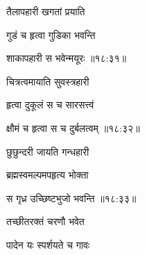 \nemslokab

{\devanagarifontbold तैलापहारी खगतां प्रयाति  \danda\dontdisplaylinenum }%
 
\nemslokac

{\devanagarifontbold गुडं च हृत्वा गुडिका भवन्ति }%
  \dontdisplaylinenum    {}


\nemslokad

{\devanagarifontbold शाकापहारी स भवेन्मयूरः {॥१८:३१॥} \veg\dontdisplaylinenum }%

\ujvers{}

\nemslokab

{\devanagarifontbold चित्रत्वमायाति सुवस्त्रहारी  \danda\dontdisplaylinenum }%
 
\nemslokac

{\devanagarifontbold हृत्वा दुकूलं स च सारसत्त्वं }%
  \dontdisplaylinenum

\nemslokad

{\devanagarifontbold क्षौमं च हृत्वा स च दुर्बलत्वम् {॥१८:३२॥} \veg\dontdisplaylinenum }%
 
\ujvers{}

\nemslokab

{\devanagarifontbold छुछुन्दरी जायति गन्धहारी  \danda\dontdisplaylinenum }%
 
\nemslokac

{\devanagarifontbold ब्रह्मस्वमल्पमपहृत्य भोक्ता }%
  \dontdisplaylinenum

\nemslokad

{\devanagarifontbold स गृध्र उच्छिष्टभुजो भवन्ति {॥१८:३३॥} \veg\dontdisplaylinenum }%
 
\ujvers{}

\nemslokab

{\devanagarifontbold तच्छीतरक्तं चरणौ भवेत  \danda\dontdisplaylinenum }%
 
\nemslokac

{\devanagarifontbold पादेन यः स्पर्शयते च गावः }%
  \dontdisplaylinenum

\nemslokad

